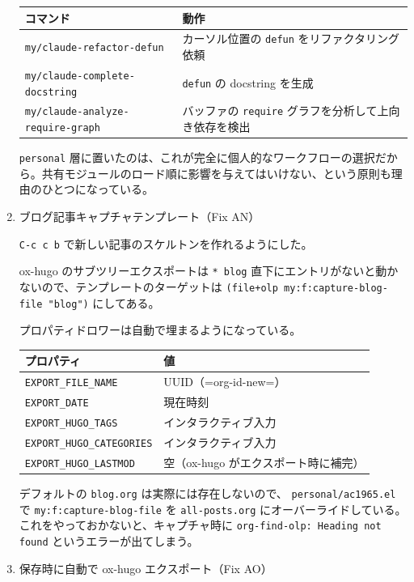 \documentclass[11pt]{article}
\begin{document}
\begin{enumerate}
\begin{center}
\begin{tabular}{ll}
コマンド & 動作\\
\hline
\texttt{my/claude-refactor-defun} & カーソル位置の \texttt{defun} をリファクタリング依頼\\
\texttt{my/claude-complete-docstring} & \texttt{defun} の docstring を生成\\
\texttt{my/claude-analyze-require-graph} & バッファの \texttt{require} グラフを分析して上向き依存を検出\\
\end{tabular}
\end{center}

\texttt{personal} 層に置いたのは、これが完全に個人的なワークフローの選択だから。共有モジュールのロード順に影響を与えてはいけない、という原則も理由のひとつになっている。
\item ブログ記事キャプチャテンプレート（Fix AN）
\label{sec:org0b3498d}

\texttt{C-c c b} で新しい記事のスケルトンを作れるようにした。

ox-hugo のサブツリーエクスポートは \texttt{* blog} 直下にエントリがないと動かないので、テンプレートのターゲットは \texttt{(file+olp my:f:capture-blog-file "blog")} にしてある。

プロパティドロワーは自動で埋まるようになっている。

\begin{center}
\begin{tabular}{ll}
プロパティ & 値\\
\hline
\texttt{EXPORT\_FILE\_NAME} & UUID（=org-id-new=）\\
\texttt{EXPORT\_DATE} & 現在時刻\\
\texttt{EXPORT\_HUGO\_TAGS} & インタラクティブ入力\\
\texttt{EXPORT\_HUGO\_CATEGORIES} & インタラクティブ入力\\
\texttt{EXPORT\_HUGO\_LASTMOD} & 空（ox-hugo がエクスポート時に補完）\\
\end{tabular}
\end{center}

デフォルトの \texttt{blog.org} は実際には存在しないので、 \texttt{personal/ac1965.el} で \texttt{my:f:capture-blog-file} を \texttt{all-posts.org} にオーバーライドしている。これをやっておかないと、キャプチャ時に \texttt{org-find-olp: Heading not found} というエラーが出てしまう。
\item 保存時に自動で ox-hugo エクスポート（Fix AO）
\label{sec:org9ed0bca}


\end{enumerate}
\end{document}
